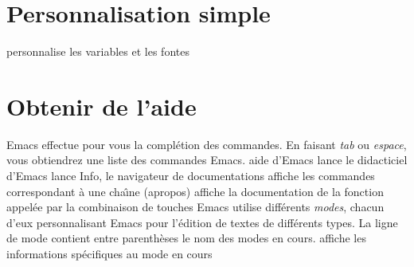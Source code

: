 \section{Personnalisation simple}

 personnalise les variables et les fontes

\section{Obtenir de l'aide}

Emacs effectue pour vous la compl\'etion des commandes. En faisant 
{\it tab\/} ou {\it espace\/}, vous obtiendrez une liste des commandes
Emacs.
\askip
{} aide d'Emacs
 lance le didacticiel d'Emacs
 lance Info, le navigateur de documentations
 affiche les commandes correspondant \`a une cha\^\i{}ne (apropos)
 affiche la documentation de la fonction appel\'ee par la
combinaison de touches
\askip
Emacs utilise diff\'erents {\it modes}, chacun d'eux personnalisant
Emacs pour l'\'edition de textes de diff\'erents types. La ligne de mode
contient entre parenth\`eses le nom des modes en cours.
\askip
{} affiche les informations sp\'ecifiques au mode en cours

\copyrightnotice

\bye

